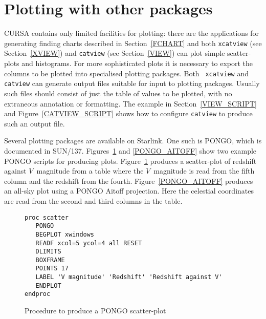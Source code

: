\documentclass[twoside,11pt]{article}
\newcommand{\xref}[3]{#1}
\newcommand{\xlabel}[1]{}
\renewcommand{\_}{\texttt{\symbol{95}}}
\begin{document}
\section{\xlabel{PLOT}\label{PLOT}Plotting with other packages}

CURSA contains only limited facilities for plotting: there are the
applications for generating finding charts described in
Section~\ref{FCHART} and both {\tt xcatview} (see Section~\ref{XVIEW})
and {\tt catview} (see Section~\ref{VIEW}) can plot simple scatter-plots
and histograms.  For more sophisticated plots it is necessary to export
the columns to be plotted into specialised plotting packages.  Both {\tt
xcatview} and {\tt catview} can generate output files suitable for input to
plotting packages.  Usually such files should consist of just the table of
values to be plotted, with no extraneous annotation or formatting. The
example in Section~\ref{VIEW_SCRIPT} and Figure~\ref{CATVIEW_SCRIPT}
shows how to configure {\tt catview} to produce such an output file.

Several plotting packages are available on Starlink. One such is PONGO,
which is documented in \xref{SUN/137}{sun137}{}\cite{SUN137}.
Figures~\ref{PONGO_SCATTER} and \ref{PONGO_AITOFF} show two example PONGO
scripts for producing plots. Figure~\ref{PONGO_SCATTER} produces a
scatter-plot of redshift against $V$\, magnitude from a table where the
$V$\, magnitude is read from the fifth column and the redshift from the
fourth.  Figure~\ref{PONGO_AITOFF} produces an all-sky plot using a PONGO
Aitoff projection. Here the celestial coordinates are read from the second
and third columns in the table.

\begin{figure}[htbp]

\begin{verbatim}
proc scatter
   PONGO
   BEGPLOT xwindows
   READF xcol=5 ycol=4 all RESET
   DLIMITS
   BOXFRAME
   POINTS 17
   LABEL 'V magnitude' 'Redshift' 'Redshift against V'
   ENDPLOT
endproc
\end{verbatim}

\caption{Procedure to produce a PONGO scatter-plot}
\label{PONGO_SCATTER}

\end{figure}
\end{document}
